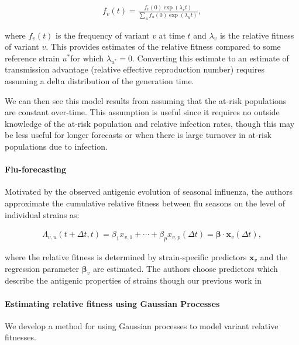 \documentclass[12pt,oneside,letterpaper]{article}
\renewcommand{\vec}[1]{\boldsymbol{#1}}
\begin{document}
\begin{align*}
    f_{v}(t) = \frac{f_{v}(0) \exp(\lambda_{v} t)}{\sum_{u} f_{u}(0) \exp(\lambda_{u} t)},
\end{align*}

where $f_{v}(t)$ is the frequency of variant $v$ at time $t$ and $\lambda_{v}$ is the relative fitness of variant $v$.
This provides estimates of the relative fitness compared to some reference strain $u^{*}$for which $\lambda_{u^*} = 0$.
Converting this estimate to an estimate of transmission advantage (relative effective reproduction number) requires assuming a delta distribution of the generation time. \cite{Wallinga2006}

We can then see this model results from assuming that the at-risk populations are constant over-time.
This assumption is useful since it requires no outside knowledge of the at-risk population and relative infection rates, though this may be less useful for longer forecasts or when there is large turnover in at-risk populations due to infection.

\paragraph{Flu-forecasting}%

Motivated by the observed antigenic evolution of seasonal influenza, the authors approximate the cumulative relative fitness between flu seasons on the level of individual strains as:

\begin{align*}
    \Lambda_{v,u}(t + \Delta t,t) = \beta_{1} x_{v,1} + \cdots + \beta_{p} x_{v, p} (\Delta t) = \vec{\beta} \cdot \vec{x}_{v} (\Delta t),
\end{align*}

where the relative fitness is determined by strain-specific predictors $\vec{x}_{v}$ and the regression parameter $\vec{\beta}_{v}$ are estimated.
The authors choose predictors which describe the antigenic properties of strains though our previous work in 

\paragraph{Estimating relative fitness using Gaussian Processes}%

We develop a method for using Gaussian processes to model variant relative fitnesses.

\end{document}
